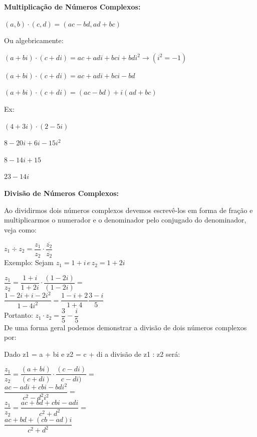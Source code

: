 \begin{multicols*}{2}
    \textbf{Multiplicação de Números Complexos:}

    $ (a, b) \cdot (c, d) = (ac - bd, ad + bc) $

    Ou algebricamente:

    $ (a + bi) \cdot (c + di) = ac +adi + bci +bdi^2 \longrightarrow (i^2 = -1) $

    $ (a + bi) \cdot (c + di) = ac + adi +bci - bd $

    $ (a +bi) \cdot (c + di) = (ac - bd) + i(ad + bc) $

    Ex:

    $ (4 + 3i) \cdot (2 - 5i) $

    $ 8 -20i + 6i - 15i^2 $

    $ 8 - 14i + 15 $

    $ 23 - 14i $

    \textbf{Divisão de Números Complexos:}

    Ao dividirmos dois números complexos devemos escrevê-los em forma de fração e multiplicarmos o numerador e o denominador pelo conjugado do denominador, veja como:

    $ z_1 \div z_2  =  \dfrac{z_1}{z_2} \cdot \dfrac{\overline{z_2}}{\overline{z_2}} $\\

    Exemplo: Sejam $ z_1 = 1 + i  \, e \,  z_2 = 1 +2i $

    $ \dfrac{z_1}{z_2} = \dfrac{1 + i}{1 + 2i} \cdot \dfrac{(1 - 2i)}{(1 - 2i)} = $\\

    $ \dfrac{1 - 2i + i -2i^2}{1 - 4i^2} = \dfrac{1 - i + 2}{1 +4} \dfrac{3 - i}{5} $\\

    Portanto: $ z_1 \cdot z_2 = \dfrac{3}{5} - \dfrac{i}{5} $\\

    De uma forma geral podemos demonstrar a divisão de dois números complexos por:

    Dado z1 = a + bi e z2 = c + di a divisão de z1 : z2 será:

    $ \dfrac{z_1}{z_2} = \dfrac{(a + bi)}{(c + di)} \cdot \dfrac{(c - di)}{c - di)} = $ \\

    $ \dfrac{ac - adi + cbi - bdi^2}{c^2 - d^2i^2} = $\\

    $ \dfrac{z_1}{z_2}= \dfrac{ac + bd + cbi - adi}{c^2 + d^2}= $\\

    $ \dfrac{ac + bd + (cb - ad)i}{c^2 + d^2} $\\


\end{multicols*}
